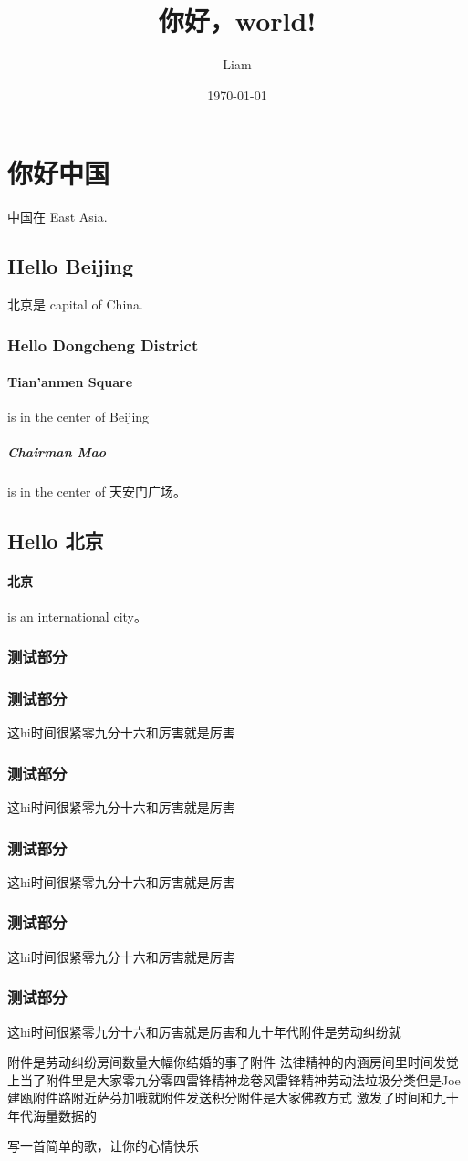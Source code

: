 \documentclass[UTF8]{ctexart}
\title{你好，world!}
\author{Liam}
\date{\today}
\begin{document}
\maketitle
\section{你好中国}
中国在 East Asia.

\subsection{Hello Beijing}
北京是 capital of China.

\subsubsection{Hello Dongcheng District}

\paragraph{Tian'anmen Square}
is in the center of Beijing

\subparagraph{Chairman Mao}
is in the center of 天安门广场。

\subsection{Hello 北京}

\paragraph{北京} is an international city。

\subsubsection{测试部分}

\subsubsection{测试部分}
这hi时间很紧零九分十六和厉害就是厉害
\subsubsection{测试部分}
这hi时间很紧零九分十六和厉害就是厉害
\subsubsection{测试部分}
这hi时间很紧零九分十六和厉害就是厉害
\subsubsection{测试部分}
这hi时间很紧零九分十六和厉害就是厉害
\subsubsection{测试部分}
这hi时间很紧零九分十六和厉害就是厉害和九十年代附件是劳动纠纷就

附件是劳动纠纷房间数量大幅你结婚的事了附件
法律精神的内涵房间里时间发觉上当了附件里是大家零九分零四雷锋精神龙卷风雷锋精神劳动法垃圾分类但是Joe建瓯附件路附近萨芬加哦就附件发送积分附件是大家佛教方式
激发了时间和九十年代海量数据的

写一首简单的歌，让你的心情快乐
\end{document}
